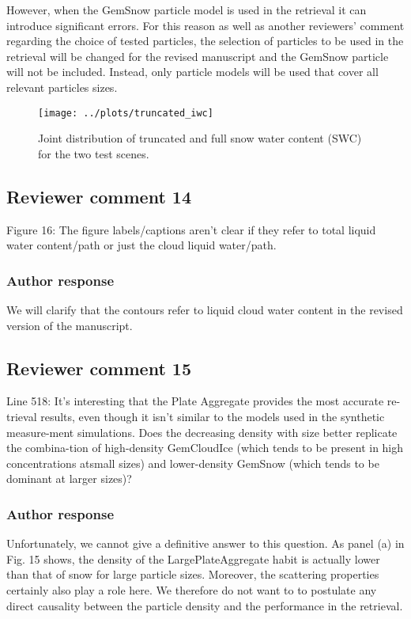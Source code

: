 \documentclass[11pt]{scrartcl}
\begin{document}
However, when the GemSnow particle model is used in the retrieval it can
introduce significant errors. For this reason as well as another reviewers'
comment regarding the choice of tested particles, the selection of particles to
be used in the retrieval will be changed for the revised manuscript and the
GemSnow particle will not be included. Instead, only particle models will be used
that cover all relevant particles sizes.

\begin{figure}[!hbpt]
  \begin{center}
  \texttt{[image: ../plots/truncated\_iwc]}
  \caption{Joint distribution of truncated and full snow water content (SWC) for the
    two test scenes.}
  \end{center}
\end{figure}

\subsection*{Reviewer comment 14}

Figure 16: The figure labels/captions aren't clear if they refer to total liquid water
content/path or just the cloud liquid water/path.

\subsubsection{Author response}

We will clarify that the contours refer to liquid cloud water content in the revised
version of the manuscript.

\subsection*{Reviewer comment 15}

 Line 518: It’s interesting that the Plate Aggregate provides the most accurate
 re-trieval results, even though it isn’t similar to the models used in the
 synthetic measure-ment simulations. Does the decreasing density with size
 better replicate the combina-tion of high-density GemCloudIce (which tends to
 be present in high concentrations atsmall sizes) and lower-density GemSnow
 (which tends to be dominant at larger sizes)?

\subsubsection{Author response}
Unfortunately, we cannot give a definitive answer to this question. As panel (a)
in Fig. 15 shows, the density of the LargePlateAggregate habit is actually lower
than that of snow for large particle sizes. Moreover, the scattering properties
certainly also play a role here. We therefore do not want to to postulate any
direct causality between the particle density and the performance in the
retrieval.



\end{document}
